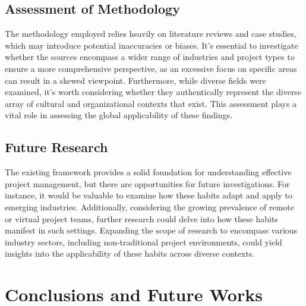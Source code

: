 \documentclass{article}
\begin{document}
\subsection{Assessment of Methodology}

The methodology employed relies heavily on literature reviews and case studies, which may introduce potential inaccuracies or biases. It's essential to investigate whether the sources encompass a wider range of industries and project types to ensure a more comprehensive perspective, as an excessive focus on specific areas can result in a skewed viewpoint. Furthermore, while diverse fields were examined, it's worth considering whether they authentically represent the diverse array of cultural and organizational contexts that exist. This assessment plays a vital role in assessing the global applicability of these findings.

\subsection{Future Research}

The existing framework provides a solid foundation for understanding effective project management, but there are opportunities for future investigations. For instance, it would be valuable to examine how these habits adapt and apply to emerging industries. Additionally, considering the growing prevalence of remote or virtual project teams, further research could delve into how these habits manifest in such settings. Expanding the scope of research to encompass various industry sectors, including non-traditional project environments, could yield insights into the applicability of these habits across diverse contexts.

\section{Conclusions and Future Works}
\end{document}
